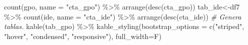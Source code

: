 \documentclass[
]{book}
\newenvironment{Shaded}{\begin{snugshade}}{\end{snugshade}}
\newcommand{\AttributeTok}[1]{\textcolor[rgb]{0.77,0.63,0.00}{#1}}
\newcommand{\CommentTok}[1]{\textcolor[rgb]{0.56,0.35,0.01}{\textit{#1}}}
\newcommand{\FunctionTok}[1]{\textcolor[rgb]{0.00,0.00,0.00}{#1}}
\newcommand{\NormalTok}[1]{#1}
\newcommand{\OtherTok}[1]{\textcolor[rgb]{0.56,0.35,0.01}{#1}}
\newcommand{\SpecialCharTok}[1]{\textcolor[rgb]{0.00,0.00,0.00}{#1}}
\newcommand{\StringTok}[1]{\textcolor[rgb]{0.31,0.60,0.02}{#1}}
\theoremstyle{definition}
\theoremstyle{definition}
\theoremstyle{definition}
\theoremstyle{definition}
\theoremstyle{remark}
\begin{document}
\begin{Shaded}
\begin{Highlighting}[]
  \FunctionTok{count}\NormalTok{(gpo, }\AttributeTok{name =} \StringTok{"cta\_gpo"}\NormalTok{) }\SpecialCharTok{\%\textgreater{}\%}
  \FunctionTok{arrange}\NormalTok{(}\FunctionTok{desc}\NormalTok{(cta\_gpo))}
\NormalTok{tab\_ide}\OtherTok{\textless{}{-}}\NormalTok{df7 }\SpecialCharTok{\%\textgreater{}\%}
  \FunctionTok{count}\NormalTok{(ide, }\AttributeTok{name =} \StringTok{"cta\_ide"}\NormalTok{) }\SpecialCharTok{\%\textgreater{}\%}
  \FunctionTok{arrange}\NormalTok{(}\FunctionTok{desc}\NormalTok{(cta\_ide))}
\CommentTok{\# Genera tablas.}
\FunctionTok{kable}\NormalTok{(tab\_gpo) }\SpecialCharTok{\%\textgreater{}\%}
  \FunctionTok{kable\_styling}\NormalTok{(}\AttributeTok{bootstrap\_options =} \FunctionTok{c}\NormalTok{(}\StringTok{"striped"}\NormalTok{, }\StringTok{"hover"}\NormalTok{, }\StringTok{"condensed"}\NormalTok{, }\StringTok{"responsive"}\NormalTok{), }\AttributeTok{full\_width=}\NormalTok{F)}
\end{Highlighting}
\end{Shaded}
\end{document}
